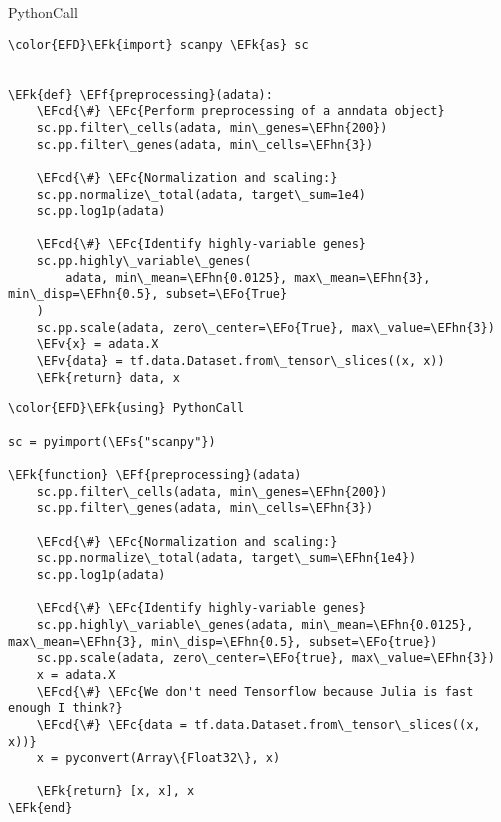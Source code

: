 \documentclass[bigger]{beamer}
\newcommand{\EFc}[1]{\textcolor{EFc}{#1}} %
\newcommand{\EFcd}[1]{\textcolor{EFcd}{#1}} %
\newcommand{\EFs}[1]{\textcolor{EFs}{#1}} %
\newcommand{\EFk}[1]{\textcolor{EFk}{#1}} %
\newcommand{\EFf}[1]{\textcolor{EFf}{#1}} %
\newcommand{\EFv}[1]{\textcolor{EFv}{#1}} %
\newcommand{\EFo}[1]{\textcolor{EFo}{#1}} %
\newcommand{\EFhn}[1]{\textcolor{EFhn}{\textbf{#1}}} %
\begin{document}
\begin{frame}[label={sec:org0b1f0ca},fragile]{PythonCall}
 \begin{Code}
\begin{Verbatim}
\color{EFD}\EFk{import} scanpy \EFk{as} sc


\EFk{def} \EFf{preprocessing}(adata):
    \EFcd{\#} \EFc{Perform preprocessing of a anndata object}
    sc.pp.filter\_cells(adata, min\_genes=\EFhn{200})
    sc.pp.filter\_genes(adata, min\_cells=\EFhn{3})

    \EFcd{\#} \EFc{Normalization and scaling:}
    sc.pp.normalize\_total(adata, target\_sum=1e4)
    sc.pp.log1p(adata)

    \EFcd{\#} \EFc{Identify highly-variable genes}
    sc.pp.highly\_variable\_genes(
        adata, min\_mean=\EFhn{0.0125}, max\_mean=\EFhn{3}, min\_disp=\EFhn{0.5}, subset=\EFo{True}
    )
    sc.pp.scale(adata, zero\_center=\EFo{True}, max\_value=\EFhn{3})
    \EFv{x} = adata.X
    \EFv{data} = tf.data.Dataset.from\_tensor\_slices((x, x))
    \EFk{return} data, x
\end{Verbatim}
\end{Code}

\begin{Code}
\begin{Verbatim}
\color{EFD}\EFk{using} PythonCall

sc = pyimport(\EFs{"scanpy"})

\EFk{function} \EFf{preprocessing}(adata)
    sc.pp.filter\_cells(adata, min\_genes=\EFhn{200})
    sc.pp.filter\_genes(adata, min\_cells=\EFhn{3})

    \EFcd{\#} \EFc{Normalization and scaling:}
    sc.pp.normalize\_total(adata, target\_sum=\EFhn{1e4})
    sc.pp.log1p(adata)

    \EFcd{\#} \EFc{Identify highly-variable genes}
    sc.pp.highly\_variable\_genes(adata, min\_mean=\EFhn{0.0125}, max\_mean=\EFhn{3}, min\_disp=\EFhn{0.5}, subset=\EFo{true})
    sc.pp.scale(adata, zero\_center=\EFo{true}, max\_value=\EFhn{3})
    x = adata.X
    \EFcd{\#} \EFc{We don't need Tensorflow because Julia is fast enough I think?}
    \EFcd{\#} \EFc{data = tf.data.Dataset.from\_tensor\_slices((x, x))}
    x = pyconvert(Array\{Float32\}, x)

    \EFk{return} [x, x], x
\EFk{end}
\end{Verbatim}
\end{Code}
\end{frame}
\end{document}
